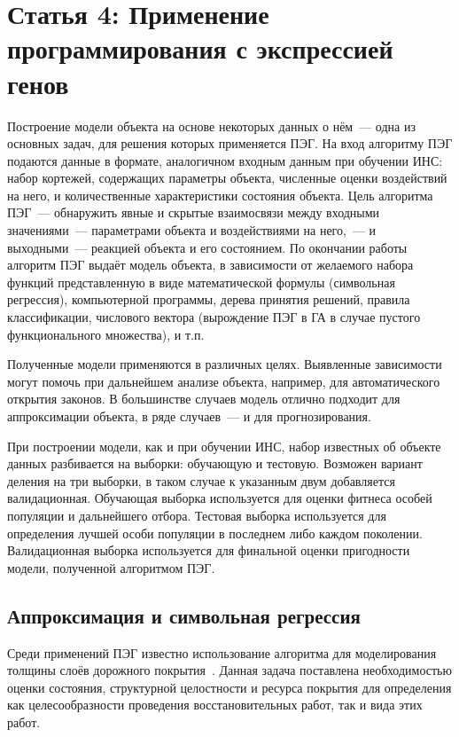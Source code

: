 \section{Статья 4: Применение программирования с экспрессией генов}

Построение модели объекта на основе некоторых данных о нём~--- одна из основных задач, для решения которых применяется ПЭГ. На вход алгоритму ПЭГ подаются данные в формате, аналогичном входным данным при обучении ИНС: набор кортежей, содержащих параметры объекта, численные оценки воздействий на него, и количественные характеристики состояния объекта. Цель алгоритма ПЭГ~--- обнаружить явные и скрытые взаимосвязи между входными значениями~--- параметрами объекта и воздействиями на него,~--- и выходными~--- реакцией объекта и его состоянием. По окончании работы алгоритм ПЭГ выдаёт модель объекта, в зависимости от желаемого набора функций представленную в виде математической формулы (символьная регрессия), компьютерной программы, дерева принятия решений, правила классификации, числового вектора (вырождение ПЭГ в ГА в случае пустого функционального множества), и т.п.

Полученные модели применяются в различных целях. Выявленные зависимости могут помочь при дальнейшем анализе объекта, например, для автоматического открытия законов. В большинстве случаев модель отлично подходит для аппроксимации объекта, в ряде случаев~--- и для прогнозирования.

При построении модели, как и при обучении ИНС, набор известных об объекте данных разбивается на выборки: обучающую и тестовую. Возможен вариант деления на три выборки, в таком случае к указанным двум добавляется валидационная. Обучающая выборка используется для оценки фитнеса особей популяции и дальнейшего отбора. Тестовая выборка используется для определения лучшей особи популяции в последнем либо каждом поколении. Валидационная выборка используется для финальной оценки пригодности модели, полученной алгоритмом ПЭГ.

\subsection{Аппроксимация и символьная регрессия}

Среди применений ПЭГ известно использование алгоритма для моделирования толщины слоёв дорожного покрытия~\cite{Terzi:2005:JAS, saltan:2005:IJEMS}. Данная задача поставлена необходимостью оценки состояния, структурной целостности и ресурса покрытия для определения как целесообразности проведения восстановительных работ, так и вида этих работ.


